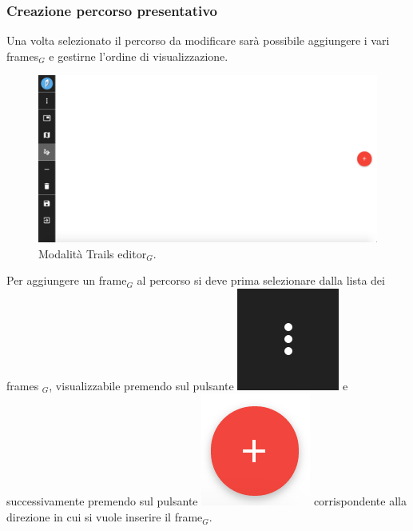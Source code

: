 \subsubsection{Creazione percorso presentativo}
Una volta selezionato il percorso da modificare sarà possibile aggiungere i vari frames$_G$ e gestirne l'ordine di visualizzazione.

\begin{figure}[!h]
\begin{center}
\includegraphics[scale=0.35]{img/edit_trail.png}
\caption{Modalità Trails editor$_G$.}
\end{center}
\end{figure}

Per aggiungere un frame$_G$ al percorso si deve prima selezionare dalla lista dei frames $_G$, visualizzabile premendo sul pulsante \includegraphics[scale=0.4]{img/frames_to_be_added.png} e successivamente premendo sul pulsante \includegraphics[scale=0.4]{img/add.png} corrispondente alla direzione in cui si vuole inserire il frame$_G$.\\


